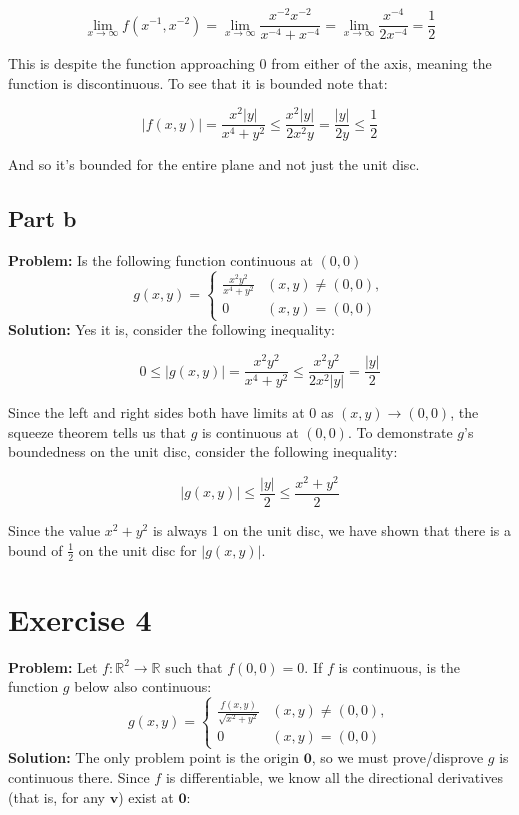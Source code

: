 \documentclass{article}
\begin{document}
$$\lim_{x\to\infty}f(x^{-1},x^{-2})=\lim_{x\to\infty}\frac{x^{-2}x^{-2}}{x^{-4}+x^{-4}}=\lim_{x\to\infty}\frac{x^{-4}}{2x^{-4}}=\frac{1}{2}$$

This is despite the function approaching 0 from either of the axis, meaning the function is discontinuous. To see that it is bounded note that:

$$|f(x,y)|=\frac{x^2|y|}{x^4+y^2}\le\frac{x^2|y|}{2x^2y}=\frac{|y|}{2y}\le\frac{1}{2}$$

And so it's bounded for the entire plane and not just the unit disc.

\subsection*{Part b}
\textbf{Problem:} Is the following function continuous at $(0,0)$
$$g(x,y)=\begin{cases}
          \frac{x^2y^2}{x^4+y^2} & (x,y)\not=(0,0), \\
          0 & (x,y)=(0,0)
          \end{cases}$$
\textbf{Solution:} Yes it is, consider the following inequality:

$$0\le|g(x,y)|=\frac{x^2y^2}{x^4+y^2}\le\frac{x^2y^2}{2x^2|y|}=\frac{|y|}{2}$$

Since the left and right sides both have limits at 0 as $(x,y)\to(0,0)$, the squeeze theorem tells us that $g$ is continuous at $(0,0)$. To demonstrate $g$'s boundedness on the unit disc, consider the following inequality:

$$|g(x,y)|\le\frac{|y|}{2}\le\frac{x^2+y^2}{2}$$

Since the value $x^2+y^2$ is always 1 on the unit disc, we have shown that there is a bound of $\frac{1}{2}$ on the unit disc for $|g(x,y)|$.

\section*{Exercise 4}
\textbf{Problem:} Let $f:\mathbb R^2\to\mathbb R$ such that $f(0,0)=0$. If $f$ is continuous, is the function $g$ below also continuous:
$$g(x,y)=\begin{cases}
          \frac{f(x,y)}{\sqrt{x^2+y^2}} & (x,y)\not=(0,0), \\
          0 & (x,y)=(0,0)
          \end{cases}$$
\textbf{Solution:} The only problem point is the origin $\mathbf 0$, so we must prove/disprove $g$ is continuous there. Since $f$ is differentiable, we know all the directional derivatives (that is, for any $\mathbf v$) exist at $\mathbf 0$:
\end{document}
